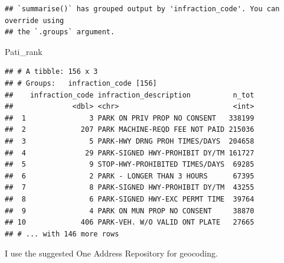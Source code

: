 \documentclass[
]{article}
\newenvironment{Shaded}{\begin{snugshade}}{\end{snugshade}}
\newcommand{\NormalTok}[1]{#1}
\begin{document}
\begin{verbatim}
## `summarise()` has grouped output by 'infraction_code'. You can override using
## the `.groups` argument.
\end{verbatim}

\begin{Shaded}
\begin{Highlighting}[]
\NormalTok{Pati\_rank}
\end{Highlighting}
\end{Shaded}

\begin{verbatim}
## # A tibble: 156 x 3
## # Groups:   infraction_code [156]
##    infraction_code infraction_description          n_tot
##              <dbl> <chr>                           <int>
##  1               3 PARK ON PRIV PROP NO CONSENT   338199
##  2             207 PARK MACHINE-REQD FEE NOT PAID 215036
##  3               5 PARK-HWY DRNG PROH TIMES/DAYS  204658
##  4              29 PARK-SIGNED HWY-PROHIBIT DY/TM 161727
##  5               9 STOP-HWY-PROHIBITED TIMES/DAYS  69285
##  6               2 PARK - LONGER THAN 3 HOURS      67395
##  7               8 PARK-SIGNED HWY-PROHIBIT DY/TM  43255
##  8               6 PARK-SIGNED HWY-EXC PERMT TIME  39764
##  9               4 PARK ON MUN PROP NO CONSENT     38870
## 10             406 PARK-VEH. W/O VALID ONT PLATE   27665
## # ... with 146 more rows
\end{verbatim}

I use the suggested One Address Repository for geocoding.
\end{document}
